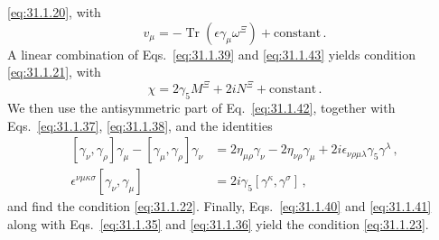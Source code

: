 \eqref{eq:31.1.20}, with
\begin{equation}
  v_\mu=-\operatorname{Tr}(\epsilon\gamma_\mu\omega^\Xi)
  +\text{constant}\,.
  \tag{31.1.45}\label{eq:31.1.45}
\end{equation}
A linear combination of Eqs.~\eqref{eq:31.1.39} and
\eqref{eq:31.1.43} yields condition \eqref{eq:31.1.21}, with
\begin{equation}
  \chi=2\gamma_5M^\Xi+2iN^\Xi+\text{constant}\,.
  \tag{31.1.46}\label{eq:31.1.46}
\end{equation}
We then use the antisymmetric part of Eq.~\eqref{eq:31.1.42}, together with
Eqs.~\eqref{eq:31.1.37}, \eqref{eq:31.1.38}, and the identities
\[
  \begin{aligned}
  [\gamma_\nu,\gamma_\rho]\gamma_\mu
  -[\gamma_\mu,\gamma_\rho]\gamma_\nu
  &=
  2\eta_{\mu\rho}\gamma_\nu-2\eta_{\nu\rho}\gamma_\mu
  +2i\epsilon_{\nu\rho\mu\lambda}\gamma_5\gamma^\lambda\,,
  \\
  \epsilon^{\nu\mu\kappa\sigma}[\gamma_\nu,\gamma_\mu]
  &=2i\gamma_5[\gamma^\kappa,\gamma^\sigma]\,,
  \end{aligned}
\]
and find the condition \eqref{eq:31.1.22}. Finally,
Eqs.~\eqref{eq:31.1.40} and \eqref{eq:31.1.41}\hfil\break
along with
Eqs.~\eqref{eq:31.1.35} and \eqref{eq:31.1.36} yield the condition
\eqref{eq:31.1.23}.
